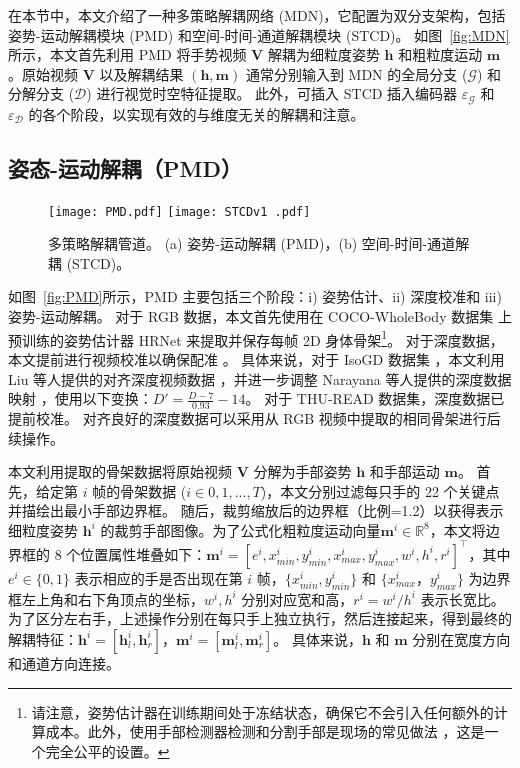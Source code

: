 在本节中，本文介绍了一种多策略解耦网络 (MDN)，它配置为双分支架构，包括姿势-运动解耦模块 (PMD) 和空间-时间-通道解耦模块 (STCD)。
如图~\ref{fig:MDN} 所示，本文首先利用 PMD 将手势视频 $\mathbf{V}$ 解耦为细粒度姿势 $\mathbf{h}$ 和粗粒度运动 $\mathbf{m}$。原始视频 $\mathbf{V}$ 以及解耦结果 $\mathbf{(h, m)}$ 通常分别输入到 MDN 的全局分支 ($\mathcal{G}$) 和分解分支 ($\mathcal{D}$) 进行视觉时空特征提取。
此外，可插入 STCD 插入编码器 $\varepsilon_{\mathcal{G}}$ 和 $\varepsilon_{\mathcal{D}}$ 的各个阶段，以实现有效的与维度无关的解耦和注意。

\subsection{姿态-运动解耦（PMD）}
\label{sec:pose-motion}
\begin{figure}[tb]
\centering
\subcaptionbox{\label{fig:PMD}}
{\texttt{[image: PMD.pdf]}}
\subcaptionbox{\label{fig:STCD}}
{\texttt{[image: STCDv1 .pdf]}}
\caption{多策略解耦管道。 (a) 姿势-运动解耦 (PMD)，(b) 空间-时间-通道解耦 (STCD)。}
\label{fig:handdecomp}
\end{figure}

如图~\ref{fig:PMD}所示，PMD 主要包括三个阶段：i) 姿势估计、ii) 深度校准和 iii) 姿势-运动解耦。
对于 RGB 数据，本文首先使用在 COCO-WholeBody 数据集 \cite{jin2020whole} 上预训练的姿势估计器 HRNet \cite{sun2019deep} 来提取并保存每帧 2D 身体骨架\footnote{请注意，姿势估计器在训练期间处于冻结状态，确保它不会引入任何额外的计算成本。此外，使用手部检测器检测和分割手部是现场的常见做法 \cite{AVOLA2022108762,zhou2021regional,chen2022multi}，这是一个完全公平的设置。}。
对于深度数据，本文提前进行视频校准以确保配准 \cite{liu2017continuous}。
具体来说，对于 IsoGD 数据集 \cite{wan2016chalearn}，本文利用 Liu 等人提供的对齐深度视频数据 \cite{liu2017continuous}，并进一步调整 Narayana 等人提供的深度数据映射 \cite{narayana2018focus}，使用以下变换：$D'=\frac{D-7}{0.93}-14$。
对于 THU-READ 数据集，深度数据已提前校准。
对齐良好的深度数据可以采用从 RGB 视频中提取的相同骨架进行后续操作。

本文利用提取的骨架数据将原始视频 $\mathbf{V}$ 分解为手部姿势 $\mathbf{h}$ 和手部运动 $\mathbf{m}$。
首先，给定第 $i$ 帧的骨架数据 ($i \in 0, 1, ..., T$)，本文分别过滤每只手的 22 个关键点并描绘出最小手部边界框。
随后，裁剪缩放后的边界框（比例=1.2）以获得表示细粒度姿势 $\mathbf{h}^{i}$ 的裁剪手部图像。为了公式化粗粒度运动向量$\mathbf{m}^{i} \in \mathbb{R}^{8}$，本文将边界框的 8 个位置属性堆叠如下：$\mathbf{m}^{i} = \left[e^{i}, x^{i}_{min}, y^{i}_{min}, x^{i}_{max}, y^{i}_{max}, w^{i}, h^{i}, r^{i}\right]^{\top}$，其中 $e^{i} \in \{0, 1\}$ 表示相应的手是否出现在第 $i$ 帧，$\{x^{i}_{min}, y^{i}_{min}\}$ 和 $\{x^{i}_{max}， y^{i}_{max}\}$ 为边界框左上角和右下角顶点的坐标，$w^{i}, h^{i}$ 分别对应宽和高，$r^{i}=w^{i}/h^{i}$ 表示长宽比。
为了区分左右手，上述操作分别在每只手上独立执行，然后连接起来，得到最终的解耦特征：$\mathbf{h}^{i} = \left[\mathbf{h}^{i}_l, \mathbf{h}^{i}_r\right]$，$\mathbf{m}^{i} = \left[\mathbf{m}^{i}_l, \mathbf{m}^{i}_r\right]$。
具体来说，$\mathbf{h}$ 和 $\mathbf{m}$ 分别在宽度方向和通道方向连接。

